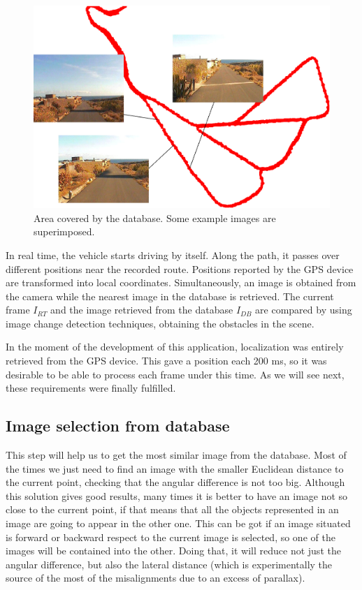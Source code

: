 \begin{figure}[thb]
  \centering
  \includegraphics{database}
  \caption{Area covered by the database. Some example images are superimposed.}
  \label{fig:cp01_image_database}
\end{figure}

In real time, the vehicle starts driving by itself. Along the path, it passes over different positions near the recorded route. Positions reported by the \acs{GPS} device are transformed into local coordinates. Simultaneously, an image is obtained from the camera while the nearest image in the database is retrieved. The current frame $I_{RT}$ and the image retrieved from the database $I_{DB}$ are compared by using image change detection techniques, obtaining the obstacles in the scene.

In the moment of the development of this application, localization was entirely retrieved from the \acs{GPS} device. This gave a position each 200 ms, so it was desirable to be able to process each frame under this time. As we will see next, these requirements were finally fulfilled.

\subsection{Image selection from database}\label{ch:chapter01_01_01}

This step will help us to get the most similar image from the database. Most of the times we just need to find an image with the smaller Euclidean distance to the current point, checking that the angular difference is not too big. Although this solution gives good results, many times it is better to have an image not so close to the current point, if that means that all the objects represented in an image are going to appear in the other one. This can be got if an image situated is forward or backward respect to the current image is selected, so one of the images will be contained into the other. Doing that, it will reduce not just the angular difference, but also the lateral distance (which is experimentally the source of the most of the misalignments due to an excess of parallax).

